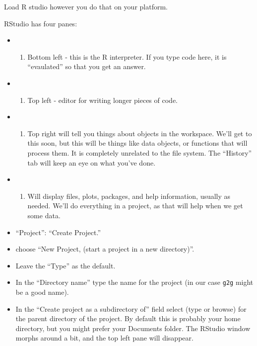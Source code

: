 \documentclass[]{article}
\providecommand{\tightlist}{%
  \setlength{\itemsep}{0pt}\setlength{\parskip}{0pt}}
\begin{document}
Load R studio however you do that on your platform.

RStudio has four panes:

\begin{itemize}
\item
  \begin{enumerate}
  \def\labelenumi{\arabic{enumi}.}
  \tightlist
  \item
    Bottom left - this is the R interpreter. If you type code here, it
    is ``evaulated'' so that you get an answer.
  \end{enumerate}
\item
  \begin{enumerate}
  \def\labelenumi{\arabic{enumi}.}
  \setcounter{enumi}{1}
  \tightlist
  \item
    Top left - editor for writing longer pieces of code.
  \end{enumerate}
\item
  \begin{enumerate}
  \def\labelenumi{\arabic{enumi}.}
  \setcounter{enumi}{2}
  \tightlist
  \item
    Top right will tell you things about objects in the workspace. We'll
    get to this soon, but this will be things like data objects, or
    functions that will process them. It is completely unrelated to the
    file system. The ``History'' tab will keep an eye on what you've
    done.
  \end{enumerate}
\item
  \begin{enumerate}
  \def\labelenumi{\arabic{enumi}.}
  \setcounter{enumi}{3}
  \tightlist
  \item
    Will display files, plots, packages, and help information, usually
    as needed. We'll do everything in a project, as that will help when
    we get some data.
  \end{enumerate}
\item
  ``Project'': ``Create Project.''
\item
  choose ``New Project, (start a project in a new directory)''.
\item
  Leave the ``Type'' as the default.
\item
  In the ``Directory name'' type the name for the project (in our case
  \texttt{g2g} might be a good name).
\item
  In the ``Create project as a subdirectory of'' field select (type or
  browse) for the parent directory of the project. By default this is
  probably your home directory, but you might prefer your Documents
  folder. The RStudio window morphs around a bit, and the top left pane
  will disappear.
\end{itemize}
\end{document}
